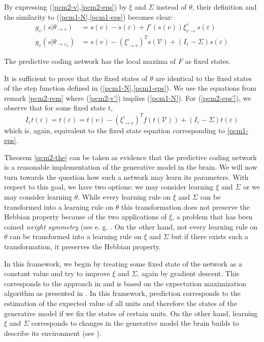\documentclass[a4paper,11pt]{article}
\begin{document}
\begin{Bem}\label{pcm2-rem}
By expressing (\ref{pcm2-v},\ref{pcm2-eps}) by $\xi$ and $\Sigma$ instead of $\theta$, their definition and the similarity to (\ref{pcm1-N},\ref{pcm1-eps}) becomes clear:
\begin{align}
\label{pcm2-v'}g_v(s|\theta_{\to v})&=s(v)-s(\varepsilon)+f'(s(v))\xi_{v\to}^{\varepsilon}s(\varepsilon)\\
\label{pcm2-eps'}g_v(s|\theta_{\to \varepsilon_v})&=s(v)-\left(\xi_{\to v}^{\varepsilon}\right)^Ts(\mathcal{V})+(I_{\varepsilon}-\Sigma)s(\varepsilon)
\end{align}
\end{Bem}
\begin{The}\label{pcm2-the}
The predictive coding network has the local maxima of $F$ as fixed states.
\end{The}
\begin{Bew}
It is sufficient to prove that the fixed states of $\theta$ are identical to the fixed states of the step function defined in (\ref{pcm1-N},\ref{pcm1-eps}). We use the equations from remark \ref{pcm2-rem} where (\ref{pcm2-v'}) implies (\ref{pcm1-N}). For (\ref{pcm2-eps'}), we observe that for some fixed state $t$,
\[I_{\varepsilon}t(\varepsilon)=t(\varepsilon)=t(v)-\left(\xi_{\to v}^{\varepsilon}\right)^Tf(t(\mathcal{V}))+(I_{\varepsilon}-\Sigma)t(\varepsilon)\]
which is, again, equivalent to the fixed state equation corresponding to \ref{pcm1-eps}.
\end{Bew}
\begin{Abs}
Theorem \ref{pcm2-the} can be taken as evidence that the predictive coding network is a reasonable implementation of the generative model in the brain. We will now turn towards the question how such a network may learn its parameters. With respect to this goal, we have two options: we may consider learning $\xi$ and $\Sigma$ or we may consider learning $\theta$. While every learning rule on $\xi$ and $\Sigma$ can be transformed into a learning rule on $\theta$ this transformation does not preserve the Hebbian property because of the two applications of $\xi$, a problem that has been coined \emph{weight symmetry} (see e. g. \cite[][1254]{Whittington2017}. On the other hand, not every learning rule on $\theta$ can be transformed into a learning rule on $\xi$ and $\Sigma$ but if there exists such a transformation, it preserves the Hebbian property.
\end{Abs}
\begin{Abs}
In this framework, we begin by treating some fixed state of the network as a constant value and try to improve $\xi$ and $\Sigma$, again by gradient descent. This corresponds to the approach in \cite{Whittington2017} and is based on the expectation maximization algorithm \cite{Dempster1977} as presented in \cite{Friston2005}. In this framework, prediction corresponds to the estimation of the expected value of all units and therefore the states of the generative model if we fix the states of certain units. On the other hand, learning $\xi$ and $\Sigma$ corresponds to changes in the generative model the brain builds to describe its environment (see \cite{Friston2005}). 
\end{Abs}
\end{document}

